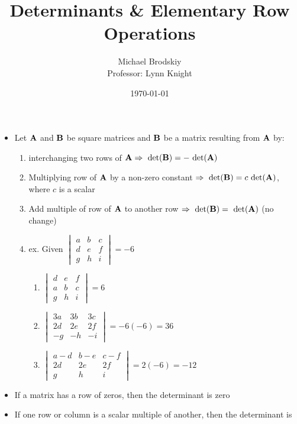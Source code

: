 \documentclass[12pt]{article}
\title{Determinants \& Elementary Row Operations}
\date{\today}
\author{Michael Brodskiy\\ \small Professor: Lynn Knight}
\begin{document}
\maketitle

\begin{itemize}

  \item Let $\bold{A}$ and $\bold{B}$ be square matrices and $\bold{B}$ be a matrix resulting from $\bold{A}$ by:

    \begin{enumerate}

      \item interchanging two rows of $\bold{A}\Rightarrow\text{ det}(\bold{B})=-\text{ det}(\bold{A})$

      \item Multiplying row of $\bold{A}$ by a non-zero constant $\Rightarrow\text{ det}(\bold{B})=c\text{ det}(\bold{A})$, where $c$ is a scalar

      \item Add multiple of row of $\bold{A}$ to another row $\Rightarrow\text{ det}(\bold{B})=\text{ det}(\bold{A})$ (no change)

      \item ex. Given $\begin{vmatrix} a & b & c\\ d & e & f\\ g & h & i \end{vmatrix}=-6$

        \begin{enumerate}

          \item $\begin{vmatrix} d & e & f\\ a & b & c\\ g & h & i \end{vmatrix}=6$

          \item $\begin{vmatrix} 3a & 3b & 3c\\ 2d & 2e & 2f\\ -g & -h & -i \end{vmatrix}=-6(-6)=36$

          \item $\begin{vmatrix} a-d & b-e & c-f\\ 2d & 2e & 2f\\ g & h & i \end{vmatrix}=2(-6)=-12$

        \end{enumerate}

    \end{enumerate}

  \item If a matrix has a row of zeros, then the determinant is zero

  \item If one row or column is a scalar multiple of another, then the determinant is 

\end{itemize}
\end{document}
